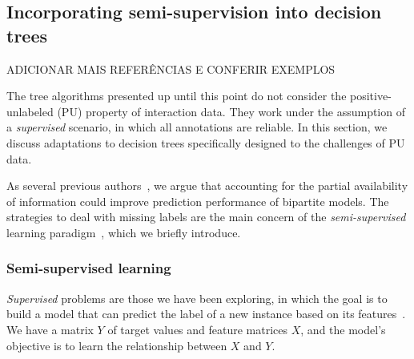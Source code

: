 \subsection{Incorporating semi-supervision into decision trees}
\label{sec:ss trees}

ADICIONAR MAIS REFERÊNCIAS E CONFERIR EXEMPLOS %

The tree algorithms presented up until this point do not consider the positive-unlabeled (PU) property of interaction data. They work under the assumption of a \emph{supervised} scenario, in which all annotations are reliable. In this section, we discuss adaptations to decision trees specifically designed to the challenges of PU data.
%


As several previous authors~\cite{pahikkala2015more,liu2017lpinrlmf,he2017simboost}, %
we argue that accounting for the partial availability of information
could improve prediction performance of bipartite models. %
The strategies to deal with missing labels are the main concern of the \emph{semi-supervised} learning paradigm~\cite{chapelle2006semisupervised,vanengelen2020survey,zhu2022introduction}, which we briefly introduce.


\subsubsection{Semi-supervised learning}
\label{sec:semi-supervised learning}

\emph{Supervised} problems are those we have been exploring, in which the
goal is to build a model that can predict the label of a new instance based on its features~\cite[p.~9]{hastie2001elements}. We have a matrix $Y$ of target values and feature matrices $X$, and the model's objective is to learn the relationship between $X$ and $Y$.

